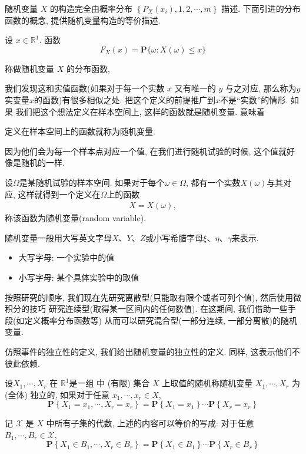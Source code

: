 随机变量 $X$ 的构造完全由概率分布 $\left\{P_{X}\left(x_i\right), 1,2, \cdots, m\right\}$ 描述. 下面引进的分布函数的概念, 提供随机变量构造的等价描述.

\begin{definition*}
    设 $x \in \mathbb{R}^1$. 函数
$$
F_{X}(x)=\mathbf{P}\{\omega: X(\omega) \leq x\}
$$

称做随机变量 $X$ 的分布函数,
\end{definition*}

我们发现这和实值函数(如果对于每一个实数 $x$ 又有唯一的 $y$ 与之对应,
那么称为$y$ 实变量$x$的函数)有很多相似之处. 把这个定义的前提推广到$x$不是``实数''的情形. 如果
我们把这个想法定义在样本空间上, 这样的函数就是随机变量. 意味着

\begin{definition*}
    定义在样本空间上的函数就称为随机变量.
\end{definition*}

因为他们会为每一个样本点对应一个值, 在我们进行随机试验的时候, 这个值就好像是随机的一样.

\begin{definition}[随机变量]
    设$\Omega$是某随机试验的样本空间. 如果对于每个$\omega\in\Omega$, 都有一个实数$X(\omega)$与其对应, 这样就得到一个定义在$\Omega$上的函数
    \begin{align*}
        X=X(\omega),
    \end{align*}
    称该函数为随机变量(random variable).
\end{definition}

随机变量一般用大写英文字母$X$、$Y$、$Z$或小写希腊字母$\xi$、$\eta$、$\gamma$来表示. 
\begin{itemize}
    \item 大写字母: 一个实验中的值
    \item 小写字母: 某个具体实验中的取值
\end{itemize}

按照研究的顺序, 我们现在先研究离散型(只能取有限个或者可列个值), 然后使用微积分的技巧
研究连续型(取得某一区间内的任何数值). 在这期间, 我们借助一些手段(如定义概率分布函数等)
从而可以研究混合型(一部分连续, 一部分离散)的随机变量.




仿照事件的独立性的定义, 我们给出随机变量的独立性的定义. 同样, 这表示他们不彼此依赖. 

\begin{definition}
    设$X_1, \cdots, X_r$ 在 $\mathbb{R}^1$是一组  中 (有限) 集合 $X$ 上取值的随机称随机变量 $X_1, \cdots, X_r$ 为 (全体) 独立的, 如果对于任意 $x_1, \cdots, x_r \in X$,
$$
\mathbf{P}\left\{X_1=x_1, \cdots, X_r=x_r\right\}=\mathbf{P}\left\{X_1=x_1\right\} \cdots \mathbf{P}\left\{X_r=x_r\right\}
$$
\end{definition}

\begin{shaded}
    记 $\mathscr{X}$ 是 $X$ 中所有子集的代数, 上述的内容可以等价的写成: 对于任意 $B_1, \cdots, B_r \in \mathscr{X}$,
    $$
    \mathbf{P}\left\{X_1 \in B_1, \cdots, X_r \in B_r\right\}=\mathbf{P}\left\{X_1 \in B_1\right\} \cdots \mathbf{P}\left\{X_r \in B_r\right\}
    $$
\end{shaded}